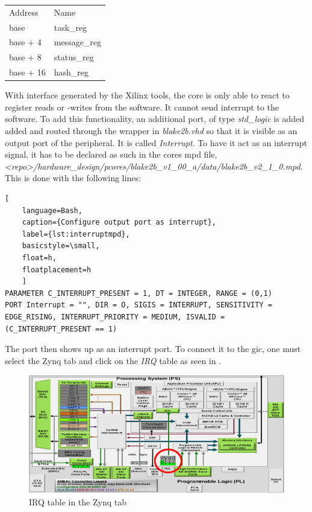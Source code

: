 \begin{tabular}{ll}
	Address & Name \\
	base     & task\_reg\\
	base + 4 & message\_reg\\
	base + 8 & status\_reg\\
	base + 16 & hash\_reg\\
\end{tabular}

With interface generated by the Xilinx tools, the core is only able to react to
register reads or -writes from the software.
It cannot send interrupt to the software.
To add this functionality, an additional port, of type \emph{std\_logic} is
added added and routed through the wrapper in \emph{blake2b.vhd} so that it is
visible as an output port of the peripheral.
It is called \emph{Interrupt}.
To have it act as an interrupt signal, it has to be declared as such in the
cores \gls{mpd} file,
\emph{<repo>/hardware_design/pcores/blake2b_v1_00_a/data/blake2b\_v2\_1\_0.mpd}.
This is done with the following lines:

\begin{lstlisting}[
	language=Bash,
	caption={Configure output port as interrupt},
	label={lst:interruptmpd},
	basicstyle=\small,
	float=h,
	floatplacement=h
	]
PARAMETER C_INTERRUPT_PRESENT = 1, DT = INTEGER, RANGE = (0,1)
PORT Interrupt = "", DIR = O, SIGIS = INTERRUPT, SENSITIVITY = EDGE_RISING, INTERRUPT_PRIORITY = MEDIUM, ISVALID = (C_INTERRUPT_PRESENT == 1)
\end{lstlisting}

The port then shows up as an interrupt port.
To connect it to the \gls{gic}, one must select the Zynq tab and click on the
\emph{IRQ} table as seen in .

\begin{figure}[h]
\centering
\includegraphics[width=1\textwidth]{sections/methodology/gic}
\caption{\label{fig:gic} IRQ table in the Zynq tab}
\end{figure}

